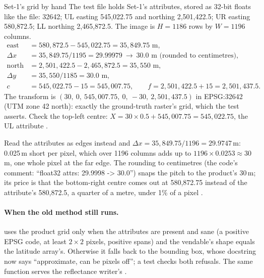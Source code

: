 \begin{worked}[label={we:submission:set1}]{Set-1's grid by hand}
The test file  holds Set-1's attributes, stored as 32-bit floats like the
file:  32642; UL easting 545,022.75 and northing 2,501,422.5; UR easting 580,872.5; LL northing
2,465,872.5. The image is $H=1186$ rows by $W=1196$ columns.
\begin{align*}
\text{east span} &= 580{,}872.5-545{,}022.75 = 35{,}849.75\text{ m},\\
\Delta x &= 35{,}849.75/1195 = 29.99979 \ \to\ 30.0\text{ m (rounded to centimetres)},\\
\text{north span} &= 2{,}501{,}422.5-2{,}465{,}872.5 = 35{,}550\text{ m},\\
\Delta y &= 35{,}550/1185 = 30.0\text{ m},\\
c &= 545{,}022.75-15 = 545{,}007.75,\qquad f = 2{,}501{,}422.5+15 = 2{,}501{,}437.5 .
\end{align*}
The transform is $(30,\ 0,\ 545{,}007.75,\ 0,\ -30,\ 2{,}501{,}437.5)$ in EPSG:32642 (UTM zone 42 north): exactly the
ground-truth raster's grid, which the test asserts. Check the top-left centre: $X=30\times0.5+545{,}007.75=545{,}022.75$,
the UL attribute \tagC.
\end{worked}

Read the attributes as edges instead and $\Delta x=35{,}849.75/1196=29.9747$\,m: 0.025\,m short per pixel, which over
1196 columns adds up to $1196\times0.0253\approx30$\,m, one whole pixel at the far edge. The rounding to centimetres
(the code's comment: ``float32 attrs: 29.9998 -> 30.0'') snaps the pitch to the product's 30\,m; its price is that the
bottom-right centre comes out at 580,872.75 instead of the attribute's 580,872.5, a quarter of a metre, under 1\% of a
pixel \tagC.

\paragraph{When the old method still runs.}  uses the product grid only when the attributes are
present and sane (a positive EPSG code, at least $2\times2$ pixels, positive spans) and the vendable's shape equals the
latitude array's. Otherwise it falls back to the bounding box, whose docstring now says ``approximate, can be pixels
off''; a test checks both refusals. The same function serves the reflectance writer's .

